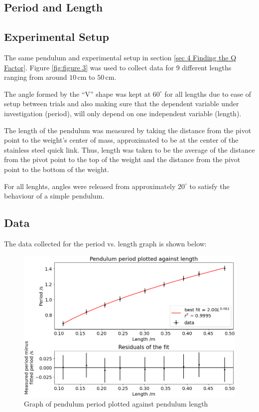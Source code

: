 \documentclass[11pt]{article}
\begin{document}
\begin{multicols}{2}
\section{Period and Length} \label{sec 5 period and length}

\subsection{Experimental Setup}
The same pendulum and experimental setup in section \ref{sec 4 Finding the Q Factor}. Figure \ref{fig:figure 3} was used to collect data for 9 different lengths ranging from around $10\,$cm to $50\,$cm.

The angle formed by the ``V'' shape was kept at $60^\circ$ for all lengths due to ease of setup between trials and also making sure that the dependent variable under investigation (period), will only depend on one independent variable (length).

The length of the pendulum was measured by taking the distance from the pivot point to the weight's center of mass, approximated to be at the center of the stainless steel quick link. Thus, length was taken to be the average of the distance from the pivot point to the top of the weight and the distance from the pivot point to the bottom of the weight.

For all lenghts, angles were released from approximately $20^\circ$ to satisfy the behaviour of a simple pendulum.

\subsection{Data}
The data collected for the period vs. length graph is shown below:

\begin{figure}[H]
    \centering
    \includegraphics[width=\linewidth]{../figures/period_vs_length.png}
    \caption{\centering Graph of pendulum period plotted against pendulum length}
    \label{fig:figure 6}
\end{figure}


\end{multicols}
\end{document}
